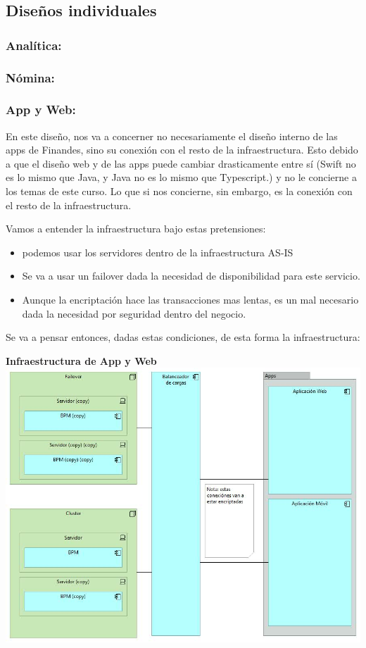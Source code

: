\documentclass[a4paper]{article}
\begin{document}
\subsection{Diseños individuales}

\subsubsection{Analítica:}

\subsubsection{Nómina:}

\subsubsection{App y Web:}

En este diseño, nos va a concerner no necesariamente el diseño interno de las apps de Finandes,
sino su conexión con el resto de la infraestructura. Esto debido a que el diseño web y de las apps
puede cambiar drasticamente entre sí (Swift no es lo mismo que Java, y Java no es lo mismo que Typescript.)
y no le concierne a los temas de este curso. Lo que si nos concierne, sin embargo, es la conexión con el resto
de la infraestructura.

Vamos a entender la infraestructura bajo estas pretensiones:
\begin{itemize}
    \item podemos usar los servidores dentro de la infraestructura AS-IS
    \item Se va a usar un failover dada la necesidad de disponibilidad para este servicio.
    \item Aunque la encriptación hace las transacciones mas lentas, es un mal necesario dada la necesidad por seguridad dentro del negocio.
\end{itemize}

Se va a pensar entonces, dadas estas condiciones, de esta forma la infraestructura:

\begin{center}
    \textbf{Infraestructura de App y Web}
    \includegraphics[scale=0.56]{webapp-diagram.jpg}    
\end{center}

\end{document}
